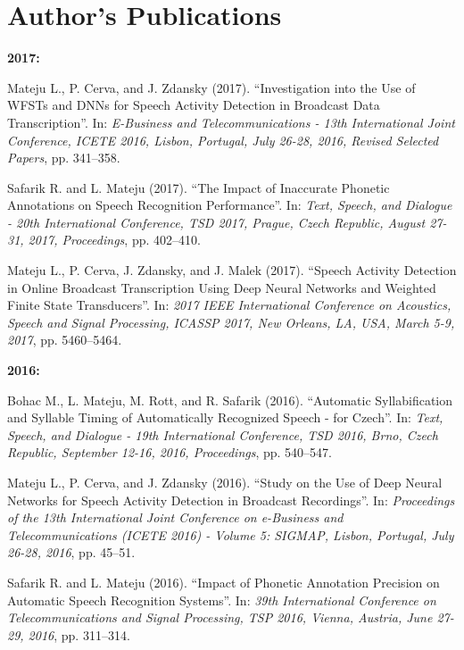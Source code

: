 \documentclass[FM,noheader,EN,bwtitles]{tulthesis}
\begin{document}

\printbibliography[title=References]
%

\newpage
\chapter*{Author's Publications}

\textbf{2017:}
	\begin{enumerate}[leftmargin=*]
		Mateju L., P. Cerva, and J. Zdansky (2017). “Investigation into the Use of WFSTs and DNNs for 
		Speech Activity Detection in Broadcast Data Transcription”. In: \textit{E-Business and
		Telecommunications - 13th International Joint Conference, ICETE 2016, Lisbon,
		Portugal, July 26-28, 2016, Revised Selected Papers}, pp. 341–358.
	
		Safarik R. and L. Mateju (2017). “The Impact of Inaccurate Phonetic Annotations 
		on Speech Recognition Performance”. In: \textit{Text, Speech, and Dialogue - 20th 
		International Conference, TSD 2017, Prague, Czech Republic, August 27-31, 2017, 
		Proceedings}, pp. 402–410.
	
		Mateju L., P. Cerva, J. Zdansky, and J. Malek (2017). “Speech Activity Detection in 
		Online Broadcast Transcription Using Deep Neural Networks and Weighted Finite
		State Transducers”. In: \textit{2017 IEEE International Conference on Acoustics, Speech 
		and Signal Processing, ICASSP 2017, New Orleans, LA, USA, March 5-9, 2017}, 
		pp. 5460–5464.
	\end{enumerate}
	
	\noindent \textbf{2016:}
	\begin{enumerate}[leftmargin=*,resume]
		Bohac M., L. Mateju, M. Rott, and R. Safarik (2016). “Automatic Syllabification and 
		Syllable Timing of Automatically Recognized Speech - for Czech”. In: \textit{Text, Speech, 
		and Dialogue - 19th International Conference, TSD 2016, Brno, Czech Republic, 
		September 12-16, 2016, Proceedings}, pp. 540–547.
	
		Mateju L., P. Cerva, and J. Zdansky (2016). “Study on the Use of Deep Neural Networks 
		for Speech Activity Detection in Broadcast Recordings”. In: \textit{Proceedings of the 13th 
		International Joint Conference on e-Business and Telecommunications (ICETE 
		2016) - Volume 5: SIGMAP, Lisbon, Portugal, July 26-28, 2016}, pp. 45–51.
		
		Safarik R. and L. Mateju (2016). “Impact of Phonetic Annotation Precision on Automatic 
		Speech Recognition Systems”. In: \textit{39th International Conference on 
		Telecommunications and Signal Processing, TSP 2016, Vienna, Austria, June 27-29, 2016}, 
		pp. 311–314.
	\end{enumerate}
	
\end{document}
